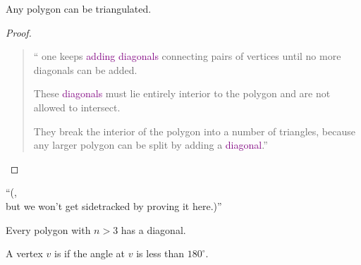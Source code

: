 \begin{frame}{}
  \begin{theorem}
    Any polygon can be triangulated.
  \end{theorem}

  \pause
  \begin{proof}
    \begin{quote}
      {\large
	`` one keeps \textcolor<6->{purple}{adding diagonals} connecting pairs of vertices 
      until no more diagonals can be added. \\[8pt] \pause

      These \textcolor<6->{purple}{diagonals} must lie entirely interior to the polygon and are not allowed to intersect. \\[8pt] \pause

      They break the interior of the polygon into a number of triangles,
      because any larger polygon can be split by adding a \textcolor<6->{purple}{diagonal}.''
    }
    \end{quote}
  \end{proof}

  \pause
  \begin{center}
    ``(, \\ but we won't get sidetracked by proving it here.)''
  \end{center}
\end{frame}


\begin{frame}{}
  \begin{theorem}
    Every polygon with $n > 3$ has a diagonal.
  \end{theorem}

  \pause
  \vspace{0.30cm}
  \begin{definition}
    A vertex $v$ is  if the  angle at $v$ is less than $180^\circ$.
  \end{definition}

  \pause
  \vspace{0.30cm}
\end{frame}

